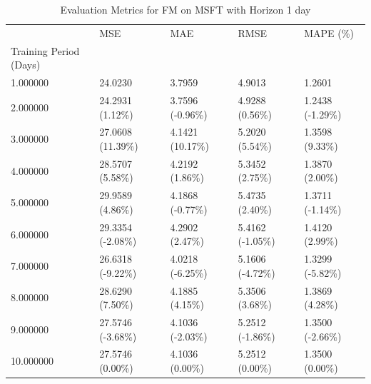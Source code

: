 \begin{table}
\caption{Evaluation Metrics for FM on MSFT with Horizon 1 day}
\label{tab:fm_MSFT_h1_metrics}
\begin{tabular}{lllll}
\toprule
 & MSE & MAE & RMSE & MAPE (\%) \\
Training Period (Days) &  &  &  &  \\
\midrule
1.000000 & 24.0230 & 3.7959 & 4.9013 & 1.2601 \\
2.000000 & 24.2931 (1.12\%) & 3.7596 (-0.96\%) & 4.9288 (0.56\%) & 1.2438 (-1.29\%) \\
3.000000 & 27.0608 (11.39\%) & 4.1421 (10.17\%) & 5.2020 (5.54\%) & 1.3598 (9.33\%) \\
4.000000 & 28.5707 (5.58\%) & 4.2192 (1.86\%) & 5.3452 (2.75\%) & 1.3870 (2.00\%) \\
5.000000 & 29.9589 (4.86\%) & 4.1868 (-0.77\%) & 5.4735 (2.40\%) & 1.3711 (-1.14\%) \\
6.000000 & 29.3354 (-2.08\%) & 4.2902 (2.47\%) & 5.4162 (-1.05\%) & 1.4120 (2.99\%) \\
7.000000 & 26.6318 (-9.22\%) & 4.0218 (-6.25\%) & 5.1606 (-4.72\%) & 1.3299 (-5.82\%) \\
8.000000 & 28.6290 (7.50\%) & 4.1885 (4.15\%) & 5.3506 (3.68\%) & 1.3869 (4.28\%) \\
9.000000 & 27.5746 (-3.68\%) & 4.1036 (-2.03\%) & 5.2512 (-1.86\%) & 1.3500 (-2.66\%) \\
10.000000 & 27.5746 (0.00\%) & 4.1036 (0.00\%) & 5.2512 (0.00\%) & 1.3500 (0.00\%) \\
\bottomrule
\end{tabular}
\end{table}
